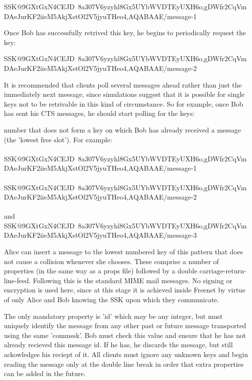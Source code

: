 \documentclass[12pt,a4paper]{article}
\begin{document}
SSK@9GXtGxN4CEJD~8a30\-7V6yzyhl8Gx5UYb\-WVDTEyUXH6o,gDWfr2CqVmDAeJ\-urKF2iieM5AkjXs\-tOl2V5jyuTHeo4,AQABAAE/message-1

Once Bob has successfully retrived this key, he begins to periodically request the key:

SSK@9GXtGxN4CEJD~8a30\-7V6yzyhl8Gx5UYbW\-VDTEyUXH6o,gDWfr2CqVmDAeJ\-urKF2iieM5AkjXs\-tOl2V5jyuTHeo4,AQABAAE/message-2

It is recommended that clients poll several messages ahead rather than just the immediately next message, since simulations suggest that it is possible for single keys not to be retrivable in this kind of circumstance. So for example, once Bob has sent his CTS messages, he should start polling for the keys:

number that does not form a key on which Bob has already received a message (the 'lowest free slot'). For example: \\
\\
SSK@9GXtGxN4CEJD~8a\-307V6yzyhl8Gx5U\-YbWVDTEyUXH6o,gDWfr2CqVm\-DAeJurKF2iieM\-5AkjXstOl2V5j\-yuTHeo4,AQABAAE/message-1 \\
\\
SSK@9GXtGxN4CEJD~8a\-307V6yzyhl8Gx5U\-YbWVDTEyUXH6o,gDWfr2CqVm\-DAeJurKF2iieM\-5AkjXstOl2V5j\-yuTHeo4,AQABAAE/message-2 \\
\\
and \\
SSK@9GXtGxN4CEJD~8a\-307V6yzyhl8Gx5U\-YbWVDTEyUXH6o,gDWfr2CqVm\-DAeJurKF2iieM\-5AkjXstOl2V5j\-yuTHeo4,AQABAAE/message-3

Alice can insert a message to the lowest numbered key of this pattern that does not cause a collision whenever she chooses. These comprise a number of properties (in the same way as a props file) followed by a double carriage-return-line-feed. Following this is the standard MIME mail messages. No signing or encryption is used here, since at this stage it is achieved inside Freenet by virtue of only Alice and Bob knowing the SSK upon which they communicate.

The only mandatory property is 'id' which may be any integer, but must uniquely identify the message from any other past or future message transported using the same 'commssk'. Bob must check this value and ensure that he has not already recieved this message id. If he has, he discards the message, but still ackowledges his reciept of it. All clients must ignore any unknown keys and begin reading the message only at the double line break in order that extra properties can be added in the future.
\end{document}

